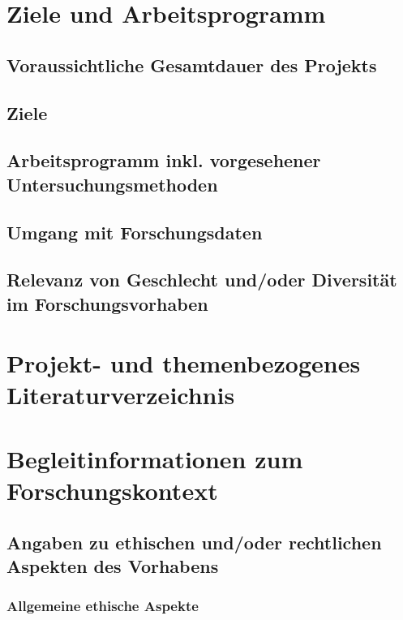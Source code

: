 \documentclass[de]{dfg-proposal}
\begin{document}
\section{Ziele und Arbeitsprogramm}\label{sec:ziele-und-arbeitsprogramm}

\subsection{Voraussichtliche Gesamtdauer des Projekts}

\subsection{Ziele}

\subsection{Arbeitsprogramm inkl. vorgesehener Untersuchungsmethoden}

\subsection{Umgang mit Forschungsdaten}

\subsection{Relevanz von Geschlecht und/oder Diversität im Forschungsvorhaben}

\section{Projekt- und themenbezogenes Literaturverzeichnis}\label{sec:literaturverzeichnis}

\printbibliography

\partbreak

\section{Begleitinformationen zum Forschungskontext}\label{sec:begleitinformationen-zum-forschungskontext}

\subsection{Angaben zu ethischen und/oder rechtlichen Aspekten des Vorhabens}

\subsubsection{Allgemeine ethische Aspekte}
\end{document}
